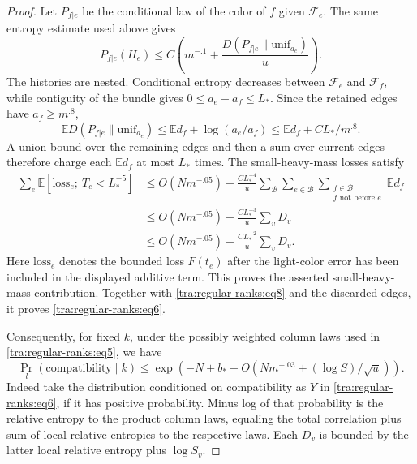 \begin{proof}
Let $P_{f|e}$ be the conditional law of the color of $f$ given
$\mathcal F_e$. The same entropy estimate used above gives
\[
 P_{f|e}(H_e)
 \le C\left(m^{-.1}
       +\frac{D(P_{f|e}\|\mathrm{unif}_{a_e})}{u}\right).
\]
The histories are nested. Conditional entropy decreases between
$\mathcal F_e$ and $\mathcal F_f$, while contiguity of the bundle
gives $0\le a_e-a_f\le L_*$. Since the retained edges have
$a_f\ge m^{.8}$,
\[
 \mathbb E D(P_{f|e}\|\mathrm{unif}_{a_e})
 \le \mathbb E d_f+\log(a_e/a_f)
 \le \mathbb E d_f+C L_*/m^{.8}.
\]
A union bound over the remaining edges and then a sum over current
edges therefore charge each $\mathbb E d_f$ at most $L_*$ times.
The small-heavy-mass losses satisfy
\[
 \begin{split}
 \sum_e\mathbb E[\mathrm{loss}_e;\ T_e<L_*^{-5}]
 &\le O(Nm^{-.05})
   +\frac{C L_*^{-4}}{u}
       \sum_{\mathcal B}
       \sum_{e\in\mathcal B}
       \sum_{\substack{f\in\mathcal B\\ f\text{ not before }e}}
                         \mathbb E d_f\\
 &\le O(Nm^{-.05})
   +\frac{C L_*^{-3}}{u}\sum_v D_v\\
 &\le O(Nm^{-.05})
   +\frac{C L_*^{-2}}{u}\sum_v D_v.
 \end{split}
\]
Here $\mathrm{loss}_e$ denotes the bounded loss $F(t_e)$ after the
light-color error has been included in the displayed additive term.
This proves the asserted small-heavy-mass contribution. Together with
\eqref{tra:regular-ranks:eq8} and the discarded edges, it proves
\eqref{tra:regular-ranks:eq6}.

Consequently, for fixed \(k\), under the possibly weighted column laws used in \eqref{tra:regular-ranks:eq5}, we have
\begin{equation}
         \Pr_l(\text{compatibility}\mid k)
           \le\exp\!\left(-N+b_*+O\left(Nm^{-.03}
                                      +(\log S)/\sqrt u\right)\right).\label{tra:regular-ranks:eq9}
\end{equation}
Indeed take the distribution conditioned on compatibility as \(Y\) in \eqref{tra:regular-ranks:eq6}, if it has positive probability. Minus log of that probability is the relative entropy to the product column laws, equaling the total correlation plus sum of local relative entropies to the respective laws. Each \(D_v\) is bounded by the latter local relative entropy plus \(\log S_v\).


\end{proof}
